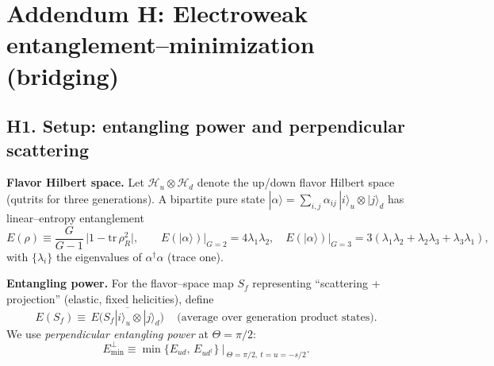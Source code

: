 \documentclass[11pt]{article}
\begin{document}
  \titlepageOpen

  \begin{abstract}


  \end{abstract}

  \titlepageClose
  \fi

  \ifdefined\standalonechapter
  \section{\papertitle}
  \else
  \fi



  \section*{Addendum H: Electroweak entanglement–minimization (bridging)}

      \subsection*{H1. Setup: entangling power and perpendicular scattering}

          \textbf{Flavor Hilbert space.}
          Let $\mathcal H_u\otimes\mathcal H_d$ denote the up/down flavor Hilbert space (qutrits for three generations). A bipartite pure state
          $|\alpha\rangle=\sum_{i,j}\alpha_{ij}\,|i\rangle_u\otimes|j\rangle_d$
          has linear–entropy entanglement
          \begin{equation}
          E(\rho)\equiv \frac{G}{G-1}\,\bigl|1-\mathrm{tr}\,\rho_R^2\bigr|,
          \qquad
          E(|\alpha\rangle)\big|_{G=2}=4\lambda_1\lambda_2,\quad
          E(|\alpha\rangle)\big|_{G=3}=3(\lambda_1\lambda_2+\lambda_2\lambda_3+\lambda_3\lambda_1),
          \end{equation}
          with $\{\lambda_i\}$ the eigenvalues of $\alpha^\dagger\alpha$ (trace one).

          \textbf{Entangling power.}
          For the flavor–space map $S_f$ representing “scattering + projection” (elastic, fixed helicities), define
          \begin{equation}
          E(S_f)\equiv \overline{\,E\!\big(S_f|i\rangle_u\otimes|j\rangle_d\big)\,}
          \quad\text{(average over generation product states).}
          \end{equation}
          We use \emph{perpendicular entangling power} at $\Theta=\pi/2$:
          \begin{equation}
          E^{\perp}_{\min}\equiv \min\{E_{ud},\,E_{ud^{\dagger}}\}\ \Big|_{\ \Theta=\pi/2,\ t=u=-s/2}.
          \end{equation}
\end{document}
